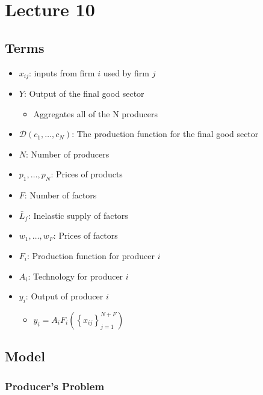 \documentclass[10pt]{article}
\begin{document}

\section{Lecture 10}

\subsection{Terms}

\begin{itemize}
    \item $x_{ij}$: inputs from firm $i$ used by firm $j$
    \item $Y$: Output of the final good sector
        \begin{itemize}
            \item Aggregates all of the N producers
        \end{itemize}
    \item $\mathcal{D}\left(c_1, \ldots, c_N\right)$: The production function for the final good sector
    \item $N$: Number of producers
    \item $p_1, \ldots, p_N$: Prices of products
    \item $F$: Number of factors
    \item $\bar{L}_f$: Inelastic supply of factors
    \item $w_1, \ldots, w_F$: Prices of factors
    \item $F_i$: Production function for producer $i$
    \item $A_i$: Technology for producer $i$
    \item $y_i$: Output of producer $i$
        \begin{itemize}
            \item $y_i=A_i F_i\left(\left\{x_{i j}\right\}_{j=1}^{N+F}\right)$
        \end{itemize}
\end{itemize}

\subsection{Model}

\subsubsection{Producer's Problem}
\end{document}
